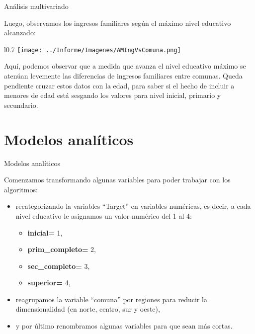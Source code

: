 \documentclass[pdf]{beamer}
\begin{document}
\begin{frame}{Análisis multivariado}
    \footnotesize

    Luego, observamos los ingresos familiares según el máximo nivel educativo alcanzado:
    \begin{wrapfigure}{l}{0.7\textwidth}
        \texttt{[image: ../Informe/Imagenes/AMIngVsComuna.png]}
    \end{wrapfigure}

    Aquí, podemos observar que a medida que avanza el nivel educativo máximo se atenúan levemente las diferencias de ingresos familiares entre comunas. Queda pendiente cruzar estos datos con la edad, para saber si el hecho de incluir a menores de edad está sesgando los valores para nivel inicial, primario y secundario.

\end{frame}

\section{Modelos analíticos}

\begin{frame}{Modelos analíticos}

    Comenzamos transformando algunas variables para poder trabajar con los algoritmos:
    \begin{itemize}
        \item recategorizando la variables ``Target'' en variables numéricas, es decir, a cada nivel educativo le asignamos un valor numérico del 1 al 4:
        \begin{itemize}
            \item \textbf{inicial=} 1,
            \item \textbf{prim\_completo=} 2,
            \item \textbf{sec\_completo=} 3,
            \item \textbf{superior=} 4,
        \end{itemize}
        \item reagrupamos la variable ``comuna'' por regiones para reducir la dimensionalidad (en norte, centro, sur y oeste),
        \item y por último renombramos algunas variables para que sean más cortas.
    \end{itemize}
    
\end{frame}

    
\end{document}
